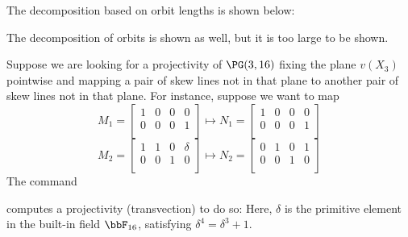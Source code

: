 The decomposition based on orbit lengths is shown below:




The decomposition of orbits is shown as well, but it is too large to be shown.

\bigskip




Suppose we are looking for a projectivity of $\PG(3,16)$ 
fixing the plane $v(X_3)$ pointwise 
and mapping a pair of skew lines not in that plane 
to another pair of skew lines not in that plane. 
For instance, suppose we want to map 
$$
M_1=\left[
\begin{array}{cccc}
1&0&0&0 \\
0&0&0&1\\
\end{array}
\right]
\mapsto
N_1=\left[
\begin{array}{cccc}
1&0&0&0 \\
0&0&0&1\\
\end{array}
\right]
$$
$$
M_2=\left[
\begin{array}{cccc}
1&1&0&\delta \\
0&0&1&0\\
\end{array}
\right]
\mapsto
N_2=\left[
\begin{array}{cccc}
0&1&0&1 \\
0&0&1&0\\
\end{array}
\right]
$$
The command 


computes a projectivity (transvection) to do so:
Here, $\delta$ is the primitive element in the built-in 
field $\bbF_{16}$, satisfying $\delta^4=\delta^3+1.$



